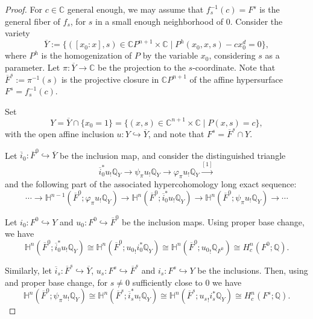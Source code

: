 \documentclass[12pt,leqno,twoside]{amsart}
\theoremstyle{remark}
\theoremstyle{remark}
\theoremstyle{definition}
\theoremstyle{remark}
\theoremstyle{remark}
\theoremstyle{remark}
\numberwithin{equation}{section}  %
\def\be{\begin{equation}}
\def\ee{\end{equation}}
\newcommand{\lra}{\longrightarrow}
\newcommand{\C}{\mathbb{C}}
\newcommand{\Q}{\mathbb{Q}}
\newcommand{\bC}{\mathbb{C}}
\newcommand{\bH}{\mathbb{H}}
\newcommand{\oF}{\overline{F}}
\begin{document}
\begin{proof}
For $c \in \C$ general enough, we may assume that $f_s^{-1}(c)=F^s$ is the general fiber of $f_s$, for $s$ in a small enough neighborhood of $0$. Consider the variety
\[
\overline{Y}:=\{\left([x_0:x],s\right) \in  \bC P^{n+1} \times \bC \mid P^h(x_0,x,s)-cx_0^d=0  \},
\]
where $P^h$ is the homogenization of $P$ by the variable $x_0$, considering $s$ as a parameter. Let $\pi:\overline{Y} \to \C$ be the projection to the $s$-coordinate. Note that $\oF^s:=\pi^{-1}(s)$ is the projective closure in $\C P^{n+1}$ of the affine hypersurface $F^s=f_s^{-1}(c)$.

Set \[ Y = \overline{Y}\cap \{x_0=1\}=\{(x,s) \in  \bC^{n+1} \times \bC \mid P(x,s)=c  \},\] with the open affine inclusion $u: Y\hookrightarrow \overline{Y}$, and note that $F^s=\oF^s \cap Y$.

Let $\overline{i}_0: \overline{F}^0 \hookrightarrow \overline{Y}$ be the inclusion map, and consider the distinguished triangle 
\[ \overline{i}_0^{*}u_{!}\Q_Y \lra \psi_{\pi}u_{!}\Q_Y \lra \varphi_{\pi}u_{!}\Q_Y \overset{[1]}{\lra}\]
and the following part of the associated hypercohomology long exact sequence:
\be\label{les10} \cdots \to \bH^{n-1}(\overline{F}^0; \varphi_{\pi}u_{!}\Q_Y) \to \bH^n(\overline{F}^0; \overline{i}_0^{*}u_{!}\Q_Y) \to \bH^{n}(\overline{F}^0; \psi_{\pi}u_{!}\Q_Y) \to \cdots \ee

Let $i_0:F^0 \hookrightarrow Y$ and $u_0:F^0 \hookrightarrow \overline{F}^0$ be the inclusion maps. 
Using proper base change, we have
\begin{equation}\label{les11}
\bH^n(\overline{F}^0; \overline{i}_0^{*}u_{!}\Q_Y) \cong 
   \mathbb{H}^n(\overline{F}^0; {u_0}_!{i}_0^{*}\mathbb{Q}_{Y}) \cong  \mathbb{H}^n(\overline{F}^0; {u_0}_!\mathbb{Q}_{F^0})  \cong H_c^n(F^0;\mathbb{Q}).
\end{equation}

Similarly, let $\overline{i}_{s}: \overline{F}^{s}\hookrightarrow \overline{Y}$, $u_{s}: F^{s} \hookrightarrow \overline{F}^{s}$ and $i_{s}: {F}^{s}\hookrightarrow Y$ be the inclusions. Then, using \cite[Ex.10.4.20]{MS} and proper base change, for $s\neq 0$ sufficiently close to $0$ we have
\begin{equation}\label{les12}
\bH^{n}(\overline{F}^0; \psi_{\pi}u_{!}\Q_Y) \cong 
 \mathbb{H}^n(\overline{F}^{s}; \overline{i}_{s}^{*}u_{!}\mathbb{Q}_{Y})
 \cong \mathbb{H}^n(\overline{F}^{s}; {u_{s}}_!i_{s}^{*}\mathbb{Q}_{Y}) \cong H^n_c(F^{s};\mathbb{Q}).
\end{equation}


\end{proof}
\end{document}
